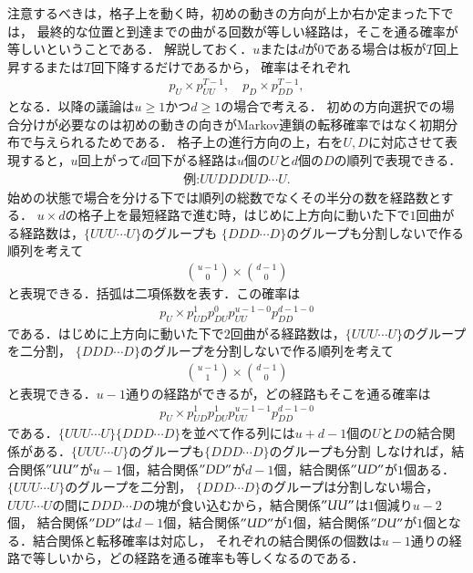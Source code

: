\documentclass[a4j,papersize,disablejfam,slide,14pt]{jsarticle}
\begin{document}
    注意するべきは，格子上を動く時，初めの動きの方向が上か右か定まった下では，
    最終的な位置と到達までの曲がる回数が等しい経路は，そこを通る確率が等しいということである．
    解説しておく．$u$または$d$が$0$である場合は板が$T$回上昇するまたは$T$回下降するだけであるから，
    確率はそれぞれ
    \begin{align}
    	p_U \times p_{UU}^{T-1},\quad p_D \times p_{DD}^{T-1},
    \end{align}
    となる．以降の議論は$u \geq 1$かつ$d \geq 1$の場合で考える．
    初めの方向選択での場合分けが必要なのは初めの動きの向きが{\rm Markov}連鎖の転移確率ではなく初期分布で与えられるためである．
    格子上の進行方向の上，右を$U,D$に対応させて表現すると，$u$回上がって$d$回下がる経路は$u$個の$U$と$d$個の$D$の順列で表現できる．
    \begin{align}
    	\mbox{例:}UUDDDUD\cdots U.
    \end{align}
    始めの状態で場合を分ける下では順列の総数でなくその半分の数を経路数とする．
    $u \times d$の格子上を最短経路で進む時，はじめに上方向に動いた下で$1$回曲がる経路数は，$\{UUU\cdots U\}$のグループも
    $\{DDD\cdots D\}$のグループも分割しないで作る順列を考えて
    \begin{align}
    	\binom{u-1}{0} \times \binom{d-1}{0}
    \end{align}
    と表現できる．括弧は二項係数を表す．この確率は
    \begin{align}
    	p_U \times p_{UD}^1 p_{DU}^0 p_{UU}^{u-1-0} p_{DD}^{d-1-0}
    \end{align}
    である．はじめに上方向に動いた下で$2$回曲がる経路数は，$\{UUU\cdots U\}$のグループを二分割，
    $\{DDD\cdots D\}$のグループを分割しないで作る順列を考えて
    \begin{align}
    	\binom{u-1}{1} \times \binom{d-1}{0}
    \end{align}
    と表現できる．$u-1$通りの経路ができるが，どの経路もそこを通る確率は
    \begin{align}
    	p_U \times p_{UD}^1 p_{DU}^1 p_{UU}^{u-1-1} p_{DD}^{d-1-0}
    \end{align}
    である．$\{UUU\cdots U\}\{DDD\cdots D\}$を並べて作る列には$u+d-1$個の$U$と$D$の結合関係がある．$\{UUU\cdots U\}$のグループも$\{DDD\cdots D\}$のグループも分割
    しなければ，結合関係$"UU"$が$u-1$個，結合関係$"DD"$が$d-1$個，結合関係$"UD"$が$1$個ある．$\{UUU\cdots U\}$のグループを二分割，
    $\{DDD\cdots D\}$のグループは分割しない場合，$UUU\cdots U$の間に$DDD\cdots D$の塊が食い込むから，結合関係$"UU"$は$1$個減り$u-2$個，
    結合関係$"DD"$は$d-1$個，結合関係$"UD"$が$1$個，結合関係$"DU"$が$1$個となる．結合関係と転移確率は対応し，
    それぞれの結合関係の個数は$u-1$通りの経路で等しいから，どの経路を通る確率も等しくなるのである．
    
\end{document}
